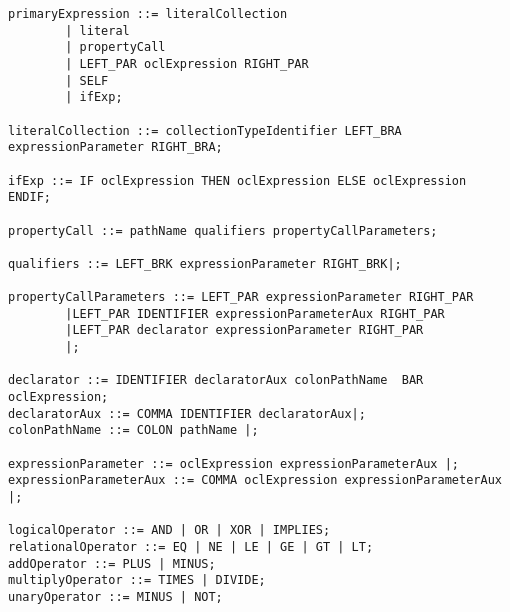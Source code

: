 \begin{lstlisting}[frame=single, caption={AnaliseLexica.flex}]
primaryExpression ::= literalCollection
		| literal
		| propertyCall
		| LEFT_PAR oclExpression RIGHT_PAR
		| SELF
		| ifExp;

literalCollection ::= collectionTypeIdentifier LEFT_BRA expressionParameter RIGHT_BRA;
 
ifExp ::= IF oclExpression THEN oclExpression ELSE oclExpression ENDIF;

propertyCall ::= pathName qualifiers propertyCallParameters;

qualifiers ::= LEFT_BRK expressionParameter RIGHT_BRK|;

propertyCallParameters ::= LEFT_PAR expressionParameter RIGHT_PAR
		|LEFT_PAR IDENTIFIER expressionParameterAux RIGHT_PAR
		|LEFT_PAR declarator expressionParameter RIGHT_PAR
		|;
						   
declarator ::= IDENTIFIER declaratorAux colonPathName  BAR oclExpression;
declaratorAux ::= COMMA IDENTIFIER declaratorAux|;
colonPathName ::= COLON pathName |;

expressionParameter ::= oclExpression expressionParameterAux |;
expressionParameterAux ::= COMMA oclExpression expressionParameterAux |;

logicalOperator ::= AND | OR | XOR | IMPLIES;
relationalOperator ::= EQ | NE | LE | GE | GT | LT;
addOperator ::= PLUS | MINUS;
multiplyOperator ::= TIMES | DIVIDE;
unaryOperator ::= MINUS | NOT;
\end{lstlisting}
\normalsize